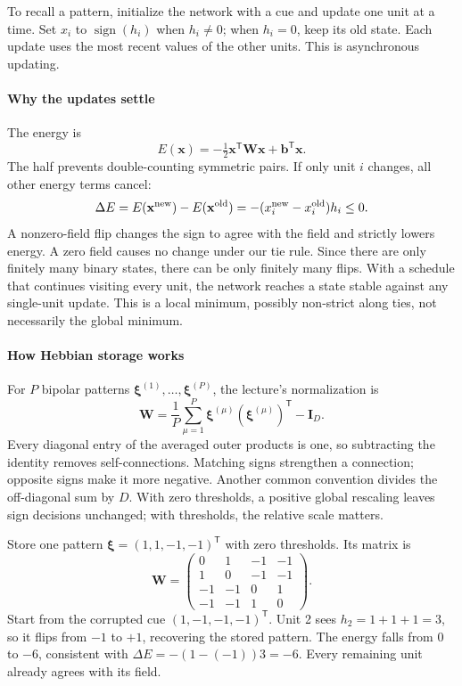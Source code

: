 \documentclass[11pt, oneside]{book}
\newcommand{\T}{^{\mathsf{T}}}           %
\begin{document}
To recall a pattern, initialize the network with a cue and update one unit at a time. Set $x_i$ to $\operatorname{sign}(h_i)$ when $h_i\ne0$; when $h_i=0$, keep its old state. Each update uses the most recent values of the other units. This is asynchronous updating.

\paragraph{Why the updates settle} The energy is
\[
 E(\mathbf{x})=-\tfrac12\mathbf{x}\T\mathbf{W}\mathbf{x}+\mathbf{b}\T\mathbf{x}.
\]
The half prevents double-counting symmetric pairs. If only unit $i$ changes, all other energy terms cancel:
\[
 \Delta E=E(\mathbf{x}^{\rm new})-E(\mathbf{x}^{\rm old})
 =-(x_i^{\rm new}-x_i^{\rm old})h_i\leq0.
\]
A nonzero-field flip changes the sign to agree with the field and strictly lowers energy. A zero field causes no change under our tie rule. Since there are only finitely many binary states, there can be only finitely many flips. With a schedule that continues visiting every unit, the network reaches a state stable against any single-unit update. This is a local minimum, possibly non-strict along ties, not necessarily the global minimum.

\paragraph{How Hebbian storage works} For $P$ bipolar patterns $\boldsymbol{\xi}^{(1)},\ldots,\boldsymbol{\xi}^{(P)}$, the lecture's normalization is
\[
 \mathbf{W}=\frac1P\sum_{\mu=1}^P\boldsymbol{\xi}^{(\mu)}(\boldsymbol{\xi}^{(\mu)})\T-\mathbf{I}_D.
\]
Every diagonal entry of the averaged outer products is one, so subtracting the identity removes self-connections. Matching signs strengthen a connection; opposite signs make it more negative. Another common convention divides the off-diagonal sum by $D$. With zero thresholds, a positive global rescaling leaves sign decisions unchanged; with thresholds, the relative scale matters.

\begin{exbox}[title={Repairing one wrong bit}]
Store one pattern $\boldsymbol{\xi}=(1,1,-1,-1)\T$ with zero thresholds. Its matrix is
\[
 \mathbf{W}=\begin{pmatrix}
 0&1&-1&-1\\1&0&-1&-1\\-1&-1&0&1\\-1&-1&1&0
 \end{pmatrix}.
\]
Start from the corrupted cue $(1,-1,-1,-1)\T$. Unit 2 sees $h_2=1+1+1=3$, so it flips from $-1$ to $+1$, recovering the stored pattern. The energy falls from $0$ to $-6$, consistent with $\Delta E=-(1-(-1))3=-6$. Every remaining unit already agrees with its field.
\end{exbox}
\end{document}
